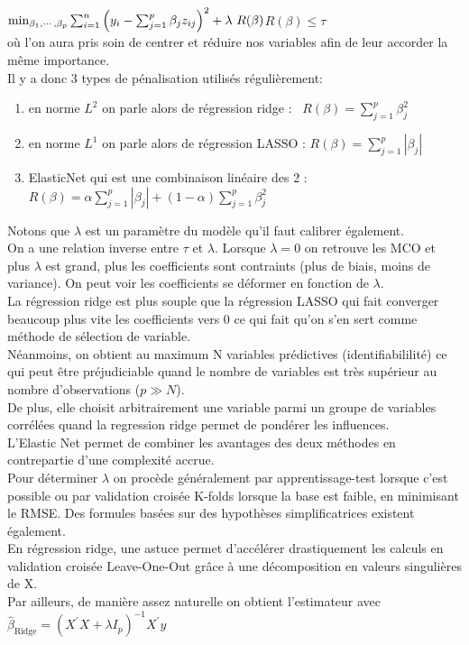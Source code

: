 \documentclass[french]{article}
\begin{document}
\begin{multicols}{2}
$\min _{\beta_{1}, \cdots, \beta_{p}} \sum_{i=1}^{n}\left(y_{i}-\sum_{j=1}^{p} \beta_{j} z_{i j}\right)^{2}+\lambda \ R(  \beta) \\ $$ R(\beta)\leq \tau$ \\

où l'on aura pris soin de centrer et réduire nos variables afin de leur accorder la même importance.
\\

Il y a donc 3 types de pénalisation utilisés régulièrement: 
\begin{enumerate}
    \item en norme $L^{2}$ on parle alors de régression ridge  : \ $R(\beta)=\sum_{j=1}^{p}\beta_{j}^{2}$
    \item en norme $L^{1}$ on parle alors de régression LASSO  : $R(\beta)=\sum_{j=1}^{p}\left|\beta_{j}\right|$
    \item ElasticNet qui est une combinaison linéaire des 2 : $R(\beta)=\alpha \sum_{j=1}^{p}\left|\beta_{j}\right|+(1-\alpha) \sum_{j=1}^{p} \beta_{j}^{2}$
\end{enumerate}

Notons que $\lambda$ est un paramètre du modèle qu'il faut calibrer également.\\
On a une relation inverse entre $\tau$ et $\lambda$. Lorsque $\lambda=0$ on retrouve les MCO et plus $\lambda$ est grand, plus les coefficients sont contraints (plus de biais, moins de variance).
On peut voir les coefficients se déformer en fonction de $\lambda$.\\
La régression ridge est plus souple que la régression LASSO qui fait converger beaucoup plus vite les coefficients vers 0 ce qui fait qu'on s'en sert comme méthode de sélection de variable.\\Néanmoins, on obtient au maximum N  variables prédictives (identifiabililité) ce qui peut être préjudiciable quand le nombre de variables est très supérieur au nombre d'observations ($p \gg N$).\\
De plus, elle choisit arbitrairement une variable parmi un groupe de variables corrélées quand la regression ridge permet de pondérer les influences.\\
L'Elastic Net permet de combiner les avantages des deux méthodes en contrepartie d'une complexité accrue.\\

Pour déterminer $\lambda$ on procède généralement par apprentissage-test lorsque c'est possible ou par validation croisée K-folds lorsque la base est faible, en minimisant le RMSE. Des formules basées sur des hypothèses simplificatrices existent également.\\
En régression ridge, une astuce permet d'accélérer drastiquement les calculs en validation croisée Leave-One-Out grâce à une décomposition en valeurs singulières de X.\\
Par ailleurs, de manière assez naturelle on obtient l'estimateur avec  $\hat{\beta}_{\text {Ridge}}=\left(X^{\prime} X+\lambda I_{p}\right)^{-1} X^{\prime} y$\\



\end{multicols}
\end{document}
